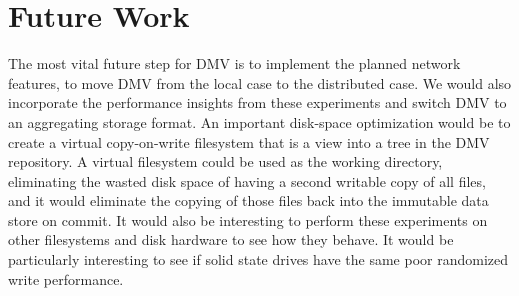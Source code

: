 \section{Future Work}

The most vital future step for DMV is to implement the planned network features, to move DMV from the local case to the distributed case.
We would also incorporate the performance insights from these experiments and switch DMV to an aggregating storage format.
An important disk-space optimization would be to create a virtual copy-on-write filesystem that is a view into a \gls{tree} in the \gls{DMV} repository.
A virtual filesystem could be used as the working directory, eliminating the wasted disk space of having a second writable copy of all files, and it would eliminate the copying of those files back into the immutable data store on \gls{commit}.
It would also be interesting to perform these experiments on other filesystems and disk hardware to see how they behave.
It would be particularly interesting to see if solid state drives have the same poor randomized write performance.
